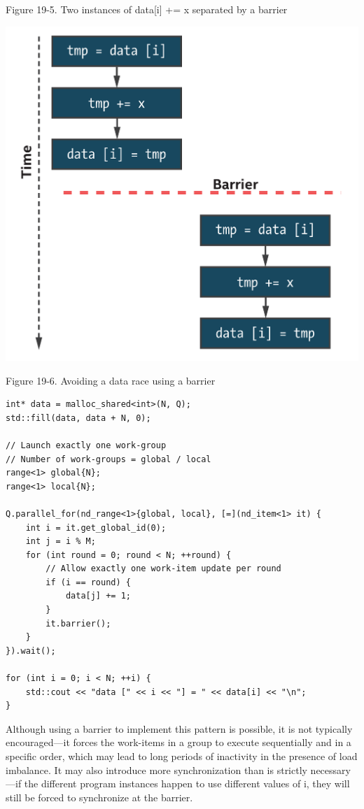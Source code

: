 \hspace*{\fill} \par %
Figure 19-5. Two instances of data[i] += x separated by a barrier
\begin{center}
	\includegraphics[width=1.0\textwidth]{content/chapter-19/images/4}
\end{center}

\hspace*{\fill} \par %
Figure 19-6. Avoiding a data race using a barrier
\begin{lstlisting}[caption={}]
int* data = malloc_shared<int>(N, Q);
std::fill(data, data + N, 0);

// Launch exactly one work-group
// Number of work-groups = global / local
range<1> global{N};
range<1> local{N};

Q.parallel_for(nd_range<1>{global, local}, [=](nd_item<1> it) {
	int i = it.get_global_id(0);
	int j = i % M;
	for (int round = 0; round < N; ++round) {
		// Allow exactly one work-item update per round
		if (i == round) {
			data[j] += 1;
		}
		it.barrier();
	}
}).wait();

for (int i = 0; i < N; ++i) {
	std::cout << "data [" << i << "] = " << data[i] << "\n";
}
\end{lstlisting}

Although using a barrier to implement this pattern is possible, it is not typically encouraged—it forces the work-items in a group to execute sequentially and in a specific order, which may lead to long periods of inactivity in the presence of load imbalance. It may also introduce more synchronization than is strictly necessary—if the different program instances happen to use different values of i, they will still be forced to synchronize at the barrier.\par

